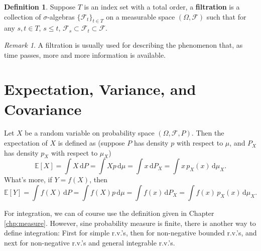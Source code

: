 \documentclass[openany]{book}
\newtheorem{theorem}{Theorem}[chapter]
\theoremstyle{definition}
\newtheorem{definition}{Definition}[chapter]
\theoremstyle{remark}
\newtheorem*{remark}{Remark}
\begin{document}
\begin{definition}
    Suppose $T$ is an index set with a total order, a \textbf{filtration} is a collection of $\sigma$-algebras $\{\mathcal{F}_t\}_{t\in T}$ on a measurable space $(\Omega,\mathcal{F})$ such that for any $s,t\in T$, $s\le t$, $\mathcal{F}_s\subset \mathcal{F}_t\subset \mathcal{F}$.
\end{definition}
\begin{remark}
    A filtration is usually used for describing the phenomenon that, as time passes, more and more information is available.
\end{remark}

\section{Expectation, Variance, and Covariance}
Let $X$ be a random variable on probability space $(\Omega,\mathcal{F},P)$. Then the expectation of $X$ is defined as (suppose $P$ has density $p$ with respect to $\mu$, and $P_X$ has density $p_X$ with respect to $\mu_X$)
\begin{equation*}\label{expectation}
    \mathbb{E}[X]=\int X\,\mathrm{d}P=\int Xp\,\mathrm{d}\mu=\int x\,\mathrm{d}P_X=\int x\,p_X(x)\,\mathrm{d}\mu_X.
\end{equation*}
What's more, if $Y=f(X)$, then
\begin{equation*}
    \mathbb{E}[Y]=\int f(X)\,\mathrm{d}P=\int f(X)p\,\mathrm{d}\mu=\int f(x)\,\mathrm{d}P_X=\int f(x)\,p_X(x)\,\mathrm{d}\mu_X.
\end{equation*}

For integration, we can of course use the definition given in Chapter \ref{chp:measure}. However, sine probability measure is finite, there is another way to define integration: First for simple r.v.'s, then for non-negative bounded r.v.'s, and next for non-negative r.v.'s and general integrable r.v.'s.

\begin{comment}
In addition to the existing convergence theorem, the following theorem is also useful.
\begin{theorem}[Bounded Convergence Theorem]
    Suppose $X_n$ and $X$ always take value in $[0,M]$, and $X_n\to X$ in probability. Then
    \begin{equation*}
        \lim_{n\to\infty}\left|\mathbb{E}[X_n]-\mathbb{E}[X]\right|\le\lim_{n\to\infty}\mathbb{E}[|X_n-X|]\to0.
    \end{equation*}
\end{theorem}
\end{comment}
\end{document}
